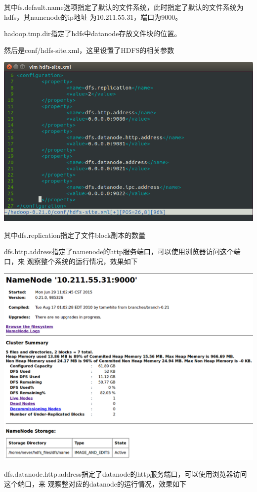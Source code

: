 其中fs.default.name选项指定了默认的文件系统，此时指定了默认的文件系统为hdfs，其namenode的ip地址
为10.211.55.31，端口为9000。

hadoop.tmp.dir指定了hdfs中datanode存放文件块的位置。

然后是conf/hdfs-site.xml，这里设置了HDFS的相关参数

\includegraphics[width=\textwidth]{image/env/cr10.png}

其中dfs.replication指定了文件block副本的数量

dfs.http.address指定了namenode的http服务端口，可以使用浏览器访问这个端口，来
观察整个系统的运行情况，效果如下

\includegraphics[width=\textwidth]{image/env/cr11.png}

dfs.datanode.http.address指定了datanode的http服务端口，可以使用浏览器访问这个端口，来
观察整对应的datanode的运行情况，效果如下

